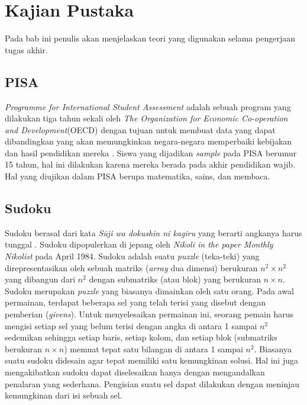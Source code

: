 \chapter{Kajian Pustaka}

Pada bab ini penulis akan menjelaskan teori yang digunakan selama pengerjaan tugas akhir.

\section{PISA}

\textit{Programme for International Student Assessment} adalah sebuah program yang dilakukan tiga tahun sekali oleh \textit{The Organization for Economic Co-operation and Development}(OECD) dengan tujuan untuk membuat data yang dapat dibandingkan yang akan memungkinkan negara-negara memperbaiki kebijakan dan hasil pendidikan mereka \cite{Pisa1}. Siswa yang dijadikan \textit{sample} pada PISA berumur 15 tahun, hal ini dilakukan karena mereka berada pada akhir pendidikan wajib. Hal yang diujikan dalam PISA berupa matematika, sains, dan membaca.

\section{Sudoku}

Sudoku berasal dari kata \textit{Sūji wa dokushin ni kagiru} yang berarti angkanya harus tunggal \cite{SATPy3}. Sudoku dipopulerkan di jepang oleh \textit{Nikoli in the paper Monthly Nikolist} pada April 1984. Sudoku adalah suatu \textit{puzzle} (teka-teki) yang direpresentasikan oleh sebuah matriks (\textit{array}
dua dimensi) berukuran ${n^2 \times n^2}$  yang dibangun dari ${n^2}$ dengan submatriks (atau blok)
yang berukuran ${n \times n}$. Sudoku merupakan \textit{puzzle}
yang biasanya dimainkan oleh satu orang.  Pada
awal permainan, terdapat beberapa sel yang telah terisi yang disebut dengan pemberian
(\textit{givens}). Untuk menyelesaikan permainan ini, seorang pemain harus mengisi setiap sel yang
belum terisi dengan angka di antara 1 sampai
$n^2$ sedemikan sehingga setiap baris, setiap kolom,
dan setiap blok (submatriks berukuran $n \times n$) memuat tepat satu bilangan di antara 1 sampai $n^2$. Biasanya suatu sudoku didesain agar tepat memiliki satu kemungkinan solusi. Hal
ini juga mengakibatkan sudoku dapat diselesaikan hanya dengan mengandalkan penalaran
yang sederhana. Pengisian suatu sel dapat dilakukan dengan meninjau kemungkinan dari
isi sebuah sel.

